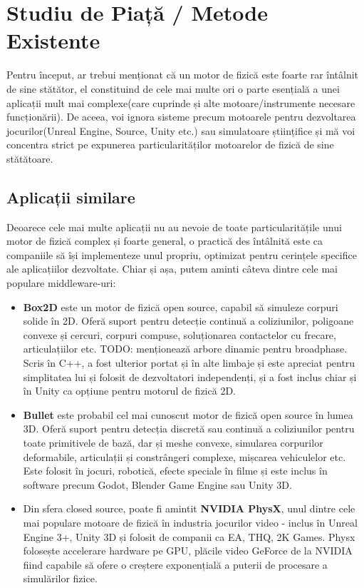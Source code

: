 \documentclass[12pt,a4paper]{report}
\begin{document}
\chapter{Studiu de Piață / Metode Existente}
Pentru început, ar trebui menționat că un motor de fizică este foarte rar întâlnit de sine stătător, el constituind de cele mai multe ori o parte esențială a unei aplicații mult mai complexe(care cuprinde și alte motoare/instrumente necesare funcționării). De aceea, voi ignora sisteme precum motoarele pentru dezvoltarea jocurilor(Unreal Engine, Source, Unity etc.) sau simulatoare științifice și mă voi concentra strict pe expunerea particularităților motoarelor de fizică de sine stătătoare.
\section{Aplicații similare}
Deoarece cele mai multe aplicații nu au nevoie de toate particularitățile unui motor de fizică complex și foarte general, o practică des întâlnită este ca companiile să își implementeze unul propriu, optimizat pentru cerințele specifice ale aplicațiilor dezvoltate. Chiar și așa, putem aminti câteva dintre cele mai populare middleware-uri: 
\begin{itemize}
	\item \textbf{Box2D}\cite{box2D} este un motor de fizică open source, capabil să simuleze corpuri solide în 2D. Oferă suport pentru detecție continuă a coliziunilor, poligoane convexe și cercuri, corpuri compuse, soluționarea contactelor cu frecare, articulațiilor etc. TODO: menționează arbore dinamic pentru broadphase. 
	Scris în C++, a fost ulterior portat și în alte limbaje și este apreciat pentru simplitatea lui și folosit de dezvoltatori independenți, și a fost inclus chiar și în Unity ca opțiune pentru motorul de fizică 2D.
	\item \textbf{Bullet}\cite{bullet} este probabil cel mai cunoscut motor de fizică open source în lumea 3D. Oferă suport pentru detecția discretă sau continuă a coliziunilor pentru toate primitivele de bază, dar și meshe convexe, simularea corpurilor deformabile, articulații și constrângeri complexe, mișcarea vehiculelor etc. Este folosit în jocuri, robotică, efecte speciale în filme și este inclus în software precum Godot, Blender Game Engine sau Unity 3D.
	\item Din sfera closed source, poate fi amintit \textbf{NVIDIA PhysX}, unul dintre cele mai populare motoare de fizică în industria jocurilor video - inclus în Unreal Engine 3+, Unity 3D și folosit de companii ca EA, THQ, 2K Games. Physx folosește accelerare hardware pe GPU, plăcile video GeForce de la NVIDIA fiind capabile să ofere o creștere exponențială a puterii de procesare a simulărilor fizice.  
\end{itemize}
\end{document}
